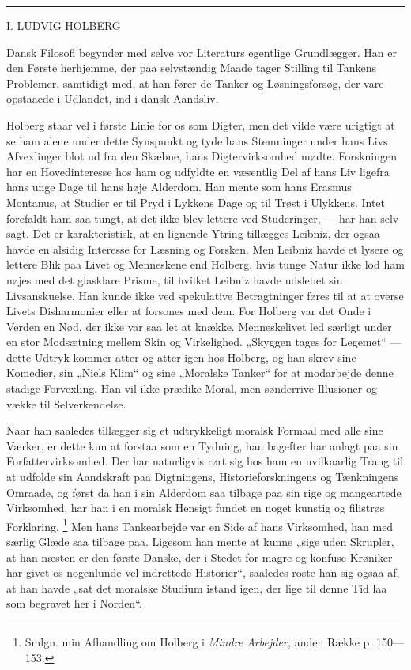 \documentclass[12pt,a4paper,openany]{book}
\newcommand{\opage}[1]{\marginnote{\footnotesize\textit{[#1]}}}
\begin{document}
\begin{center}\rule{2cm}{0.4pt}\end{center}
\clearpage

\setcounter{footnote}{0}%
\opage{3}

\begin{center}\large I. LUDVIG HOLBERG\end{center}

Dansk Filosofi begynder med selve vor Literaturs egentlige Grundlægger. Han er
den Første herhjemme, der paa selvstændig Maade tager Stilling til Tankens
Problemer, samtidigt med, at han fører de Tanker og Løsningsforsøg, der vare
opstaaede i Udlandet, ind i dansk Aandsliv.

Holberg staar vel i første Linie for os som Digter, men det vilde være urigtigt
at se ham alene under dette Synspunkt og tyde hans Stemninger under hans Livs
Afvexlinger blot ud fra den Skæbne, hans Digtervirksomhed mødte. Forskningen
har en Hovedinteresse hos ham og udfyldte en væsentlig Del af hans Liv ligefra
hans unge Dage til hans høje Alderdom. Han mente som hans Erasmus Montanus, at
Studier er til Pryd i Lykkens Dage og til Trøst i Ulykkens. Intet forefaldt ham
saa tungt, at det ikke blev lettere ved Studeringer, --- har han selv sagt. Det
er karakteristisk, at en lignende Ytring tillægges Leibniz, der ogsaa havde en
alsidig Interesse for Læsning og Forsken. Men Leibniz havde et lysere og
lettere Blik paa Livet og Menneskene end Holberg, hvis tunge Natur ikke lod ham
nøjes med det glasklare Prisme, til hvilket Leibniz havde udslebet sin
Livsanskuelse. Han kunde ikke ved spekulative Betragtninger føres til at at %
overse Livets Disharmonier eller at forsones med dem. For Holberg var det Onde
i Verden en Nød, der ikke var saa let at knække. Menneskelivet led særligt
under en stor Modsætning mellem Skin og Virkelighed. „Skyggen tages for
Legemet“ --- dette Udtryk kommer atter og atter igen hos Holberg, og han skrev
sine Komedier, sin „Niels Klim“ og sine „Moralske Tanker“
\setcounter{footnote}{0}%
\opage{4}for at modarbejde denne stadige Forvexling. Han vil ikke prædike
Moral, men sønderrive Illusioner og vække til Selverkendelse.

Naar han saaledes tillægger sig et udtrykkeligt moralsk Formaal med alle sine
Værker, er dette kun at forstaa som en Tydning, han bagefter har anlagt paa sin
Forfattervirksomhed. Der har naturligvis rørt sig hos ham en uvilkaarlig Trang
til at udfolde sin Aandskraft paa Digtningens, Historieforskningens og
Tænkningens Omraade, og først da han i sin Alderdom saa tilbage paa sin rige og
mangeartede Virksomhed, har han i en moralsk Hensigt fundet en noget kunstig og
filistrøs Forklaring.%
\footnote[1]{Smlgn. min Afhandling om Holberg i \textit{Mindre Arbejder,} anden
Række p. 150---153.} Men hans Tankearbejde var en Side af hans Virksomhed, han
med særlig Glæde saa tilbage paa. Ligesom han mente at kunne „sige uden
Skrupler, at han næsten er den første Danske, der i Stedet for magre og konfuse
Krøniker har givet os nogenlunde vel indrettede Historier“, saaledes roste han
sig ogsaa af, at han havde „sat det moralske Studium istand igen, der lige til
denne Tid laa som begravet her i Norden“.
\end{document}
